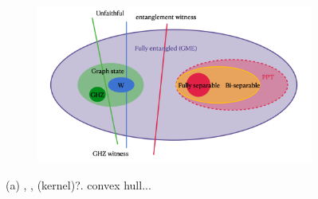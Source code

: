 \documentclass[
aps,
pra,
floatfix,
]{revtex4-2}
\theoremstyle{plain}
\theoremstyle{definition}
\newtheorem{example}{Example}
\newcommand{\ghz}{\text{GHZ}}
\begin{document}


\begin{figure}[!ht]
	\centering
	\begin{subfigure}{0.6\textwidth}
		\centering
		\includegraphics[width=.9\linewidth]{witness.png}
	\end{subfigure}
	\caption{(a) , ,  (kernel)?. convex hull... }
	\label{fig:entangle}
\end{figure}
\end{document}
